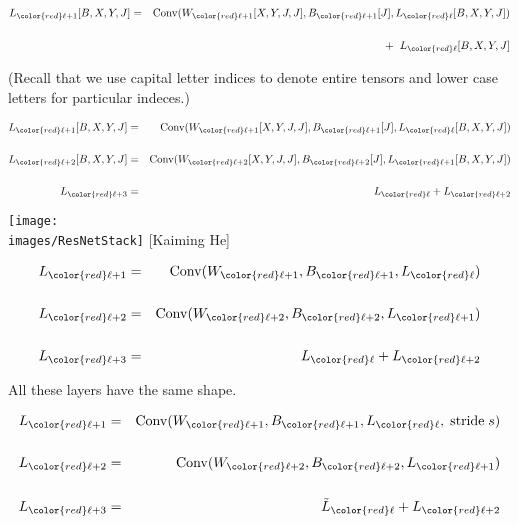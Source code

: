 {

\medskip
\begin{eqnarray*}
L_{\color{red} \ell+1}[B,X,Y,J] & = & \mathrm{Conv}(W_{\color{red} \ell+1}[X,Y,J,J],B_{\color{red} \ell+1}[J],L_{\color{red} \ell}[B,X,Y,J]) \\
\\
& & + \;\; L_{\color{red} \ell}[B,X,Y,J]
\end{eqnarray*}

\vfill (Recall that we use capital letter indices to denote entire tensors and lower case letters for particular indeces.)


\begin{eqnarray*}
L_{\color{red} \ell+1}[B,X,Y,J] & = & \mathrm{Conv}(W_{\color{red} \ell+1}[X,Y,J,J],B_{\color{red} \ell+1}[J],L_{\color{red} \ell}[B,X,Y,J]) \\
\\
L_{\color{red} \ell+2}[B,X,Y,J] & = & \mathrm{Conv}(W_{\color{red} \ell+2}[X,Y,J,J],B_{\color{red} \ell+2}[J],L_{\color{red} \ell+1}[B,X,Y,J]) \\
\\
L_{\color{red} \ell+3} & = & L_{\color{red} \ell} + L_{\color{red} \ell+2}
\end{eqnarray*}


\centerline{\texttt{[image: \\images/ResNetStack]} {\large [Kaiming He]}}


\medskip
\begin{eqnarray*}
L_{\color{red} \ell+1} & = & \mathrm{Conv}(W_{\color{red} \ell+1},B_{\color{red} \ell+1},L_{\color{red} \ell}) \\
\\
L_{\color{red} \ell+2} & = & \mathrm{Conv}(W_{\color{red} \ell+2},B_{\color{red} \ell+2},L_{\color{red} \ell+1}) \\
\\
L_{\color{red} \ell+3} & = & L_{\color{red} \ell} + L_{\color{red} \ell+2}
\end{eqnarray*}

\vfill All these layers have the same shape.


\medskip
\begin{eqnarray*}
L_{\color{red} \ell+1} & = & \mathrm{Conv}(W_{\color{red} \ell+1},B_{\color{red} \ell+1},L_{\color{red} \ell},\;\mathrm{stride} \;s) \\
\\
L_{\color{red} \ell+2} & = & \mathrm{Conv}(W_{\color{red} \ell+2},B_{\color{red} \ell+2},L_{\color{red} \ell+1}) \\
\\
L_{\color{red} \ell+3} & = & \tilde{L}_{\color{red} \ell} + L_{\color{red} \ell+2}
\end{eqnarray*}

}
